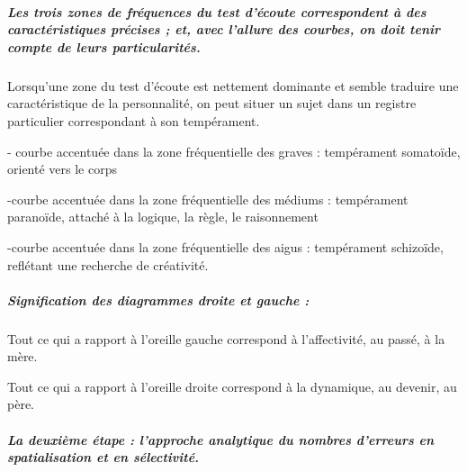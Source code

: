 \documentclass[12pt,french]{report}
\begin{document}
\subparagraph{Les trois zones de fréquences du test d'écoute correspondent à des
caractéristiques précises ; et, avec l'allure des courbes, on doit
tenir compte de leurs particularités.}

Lorsqu'une zone du test d'écoute est nettement dominante et semble
traduire une caractéristique de la personnalité, on peut situer un
sujet dans un registre particulier correspondant à son tempérament.

- courbe accentuée dans la zone fréquentielle des graves : tempérament
somatoïde, orienté vers le corps

-courbe accentuée dans la zone fréquentielle des médiums : tempérament
paranoïde, attaché à la logique, la règle, le raisonnement 

-courbe accentuée dans la zone fréquentielle des aigus : tempérament
schizoïde, reflétant une recherche de créativité.

\subparagraph{Signification des diagrammes droite et gauche : }

Tout ce qui a rapport à l'oreille gauche correspond à l\textquoteright affectivité,
au passé, à la mère. 

Tout ce qui a rapport à l'oreille droite correspond à la dynamique,
au devenir, au père. 

\subparagraph{La deuxième étape : l'approche analytique du nombres d'erreurs en
spatialisation et en sélectivité.}
\end{document}
